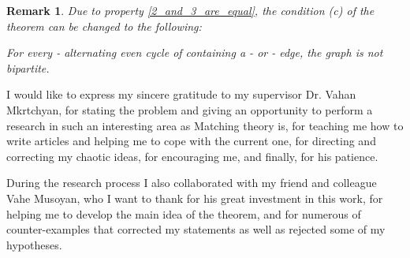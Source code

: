 \documentclass[a4paper, 12pt]{article}
\newtheorem{remark}{Remark}
\newenvironment{acknowledgements}[1][Acknowledgements]{\begin{trivlist}
\item[\hskip \labelsep {\bfseries #1}]}{\end{trivlist}}
\begin{document}
\begin{remark}
Due to property \ref{2_and_3_are_equal}, the condition (c) of the
theorem can be changed to the following:

\textit{For every - alternating even cycle  of 
containing a - or - edge, the graph  is not
bipartite.}
\end{remark}

\vspace*{2cm}

\begin{acknowledgements}
\begin{center}
\end{center}
I would like to express my sincere gratitude to my supervisor Dr.
Vahan Mkrtchyan, for stating the problem and giving an opportunity
to perform a research in such an interesting area as Matching theory
is, for teaching me how to write articles and helping me to cope
with the current one, for directing and correcting my chaotic ideas,
for encouraging me, and finally, for his patience.

During the research process I also collaborated with my friend and
colleague Vahe Musoyan, who I want to thank for his great investment
in this work, for helping me to develop the main idea of
 the theorem, and for numerous of counter-examples that corrected my
statements as well as rejected some of my hypotheses.
\end{acknowledgements}


\newpage
\end{document}
